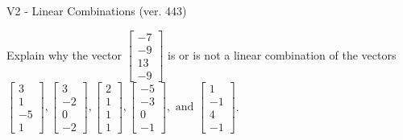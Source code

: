 \begin{exercise}
  \begin{exerciseTitle}V2 - Linear Combinations (ver. 443)\end{exerciseTitle}
  \begin{exerciseStatement}
    Explain why the vector \(\left[\begin{array}{c}
-7 \\
-9 \\
13 \\
-9
\end{array}\right]\)  is or is not a linear 
	combination of the vectors \(\left[\begin{array}{c}
3 \\
1 \\
-5 \\
1
\end{array}\right] , \left[\begin{array}{c}
3 \\
-2 \\
0 \\
-2
\end{array}\right] , \left[\begin{array}{c}
2 \\
1 \\
1 \\
1
\end{array}\right] , \left[\begin{array}{c}
-5 \\
-3 \\
0 \\
-1
\end{array}\right] , \text{ and } \left[\begin{array}{c}
1 \\
-1 \\
4 \\
-1
\end{array}\right]\).
	



\end{exerciseStatement}
\end{exercise}
